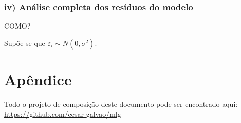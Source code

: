 \documentclass[
  letterpaper,
  DIV=11,
  numbers=noendperiod]{scrartcl}
\begin{document}
\hypertarget{iv-anuxe1lise-completa-dos-resuxedduos-do-modelo}{%
\subsubsection{iv) Análise completa dos resíduos do
modelo}\label{iv-anuxe1lise-completa-dos-resuxedduos-do-modelo}}

COMO?

Supõe-se que \(\varepsilon_i \sim N(0, \sigma^2)\).

\hypertarget{apuxeandice}{%
\section{Apêndice}\label{apuxeandice}}

Todo o projeto de composição deste documento pode ser encontrado aqui:
\url{https://github.com/cesar-galvao/mlg}
\end{document}
